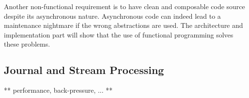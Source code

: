 Another non-functional requirement is to have clean and composable code source despite its asynchronous nature. Asynchronous
code can indeed lead to a maintenance nightmare if the wrong abstractions are used. The architecture and implementation part will
show that the use of functional programming solves these problems.

\subsection{Journal and Stream Processing}

** performance, back-pressure, ... **





